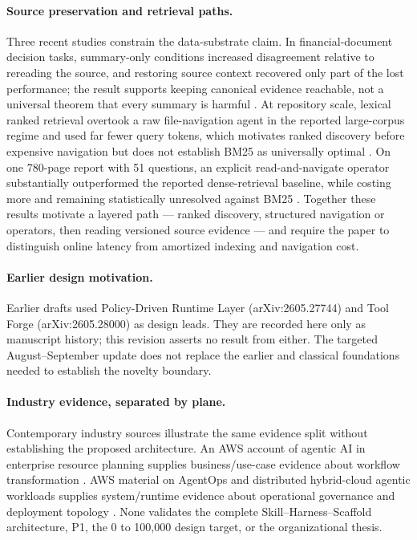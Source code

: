 \paragraph{Source preservation and retrieval paths.}
Three recent studies constrain the data-substrate claim. In financial-document decision tasks, summary-only conditions increased disagreement relative to rereading the source, and restoring source context recovered only part of the lost performance; the result supports keeping canonical evidence reachable, not a universal theorem that every summary is harmful \cite{lee2026summaries}. At repository scale, lexical ranked retrieval overtook a raw file-navigation agent in the reported large-corpus regime and used far fewer query tokens, which motivates ranked discovery before expensive navigation but does not establish BM25 as universally optimal \cite{wang2026bm25scale}. On one 780-page report with 51 questions, an explicit read-and-navigate operator substantially outperformed the reported dense-retrieval baseline, while costing more and remaining statistically unresolved against BM25 \cite{tamang2026beyondtopk}. Together these results motivate a layered path --- ranked discovery, structured navigation or operators, then reading versioned source evidence --- and require the paper to distinguish online latency from amortized indexing and navigation cost.

\paragraph{Earlier design motivation.}
Earlier drafts used Policy-Driven Runtime Layer (arXiv:2605.27744) and Tool Forge (arXiv:2605.28000) as design leads. They are recorded here only as manuscript history; this revision asserts no result from either. The targeted August--September update does not replace the earlier and classical foundations needed to establish the novelty boundary.

\paragraph{Industry evidence, separated by plane.}
Contemporary industry sources illustrate the same evidence split without establishing the proposed architecture. An AWS account of agentic AI in enterprise resource planning supplies business/use-case evidence about workflow transformation \cite{aws2026erp}. AWS material on AgentOps and distributed hybrid-cloud agentic workloads supplies system/runtime evidence about operational governance and deployment topology \cite{aws2026agentops,aws2026hybrid}. None validates the complete Skill--Harness--Scaffold architecture, P1, the 0 to 100{,}000 design target, or the organizational thesis.

